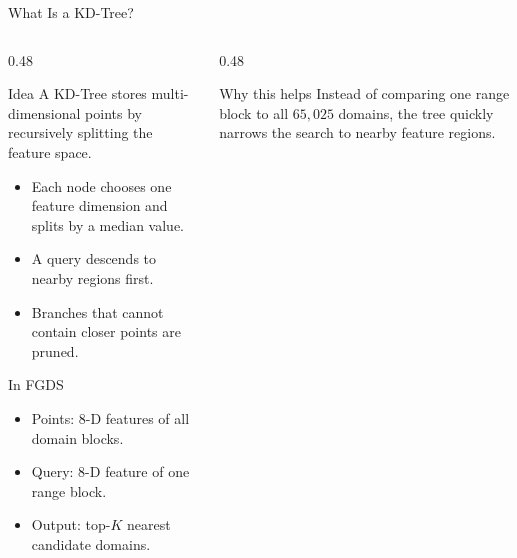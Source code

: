 \documentclass[10pt,aspectratio=169]{beamer}
\begin{document}
\begin{frame}{What Is a KD-Tree?}
  \begin{columns}[T,onlytextwidth]
    \begin{column}{0.48\textwidth}
      \begin{block}{Idea}
        A \alert{KD-Tree} stores multi-dimensional points by recursively splitting
        the feature space.
        \begin{itemize}
          \item Each node chooses one feature dimension and splits by a median value.
          \item A query descends to nearby regions first.
          \item Branches that cannot contain closer points are pruned.
        \end{itemize}
      \end{block}
      \begin{exampleblock}{In FGDS}
        \begin{itemize}
          \item Points: 8-D features of all domain blocks.
          \item Query: 8-D feature of one range block.
          \item Output: top-$K$ nearest candidate domains.
        \end{itemize}
      \end{exampleblock}
    \end{column}
    \hfill
    \begin{column}{0.48\textwidth}
      \centering
      \vspace{0.25cm}
      \begin{alertblock}{Why this helps}
        Instead of comparing one range block to all $65{,}025$ domains, the tree quickly
        narrows the search to nearby feature regions.
      \end{alertblock}
    \end{column}
  \end{columns}
\end{frame}
\end{document}
